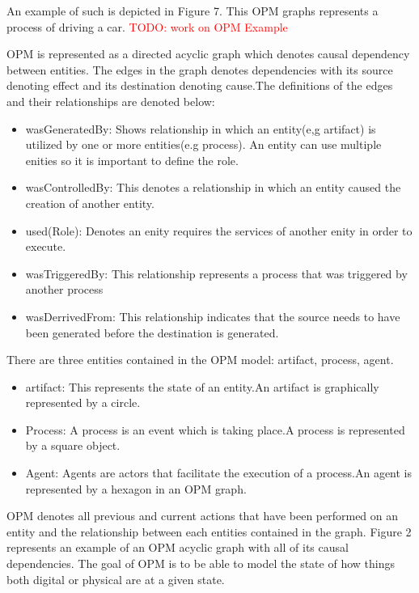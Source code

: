 An example of such is depicted in Figure 7. This OPM graphs represents a process of driving a car.  \textcolor{red}{TODO: work on OPM Example}



OPM is represented as a directed acyclic graph which denotes causal dependency between entities. The edges in the graph denotes dependencies with its source denoting effect and its destination denoting cause.The definitions of the edges and their relationships are denoted below: 


\begin{itemize}
\item wasGeneratedBy: Shows relationship in which an entity(e,g artifact) is utilized by one or  more entities(e.g process). An entity can use multiple enities so it is important to define the role.  
\item wasControlledBy: This denotes a relationship in which an entity caused the creation of another entity.
\item used(Role): Denotes an enity requires the services of another enity in order to execute.
\item wasTriggeredBy: This relationship represents a process that was triggered by another process
\item wasDerrivedFrom: This relationship indicates that the source needs to have been generated before the destination is generated.
\end{itemize}

 There are three entities contained in the OPM model: artifact, process, agent. 

\begin{itemize}
\item
artifact: This represents the state of an entity.An artifact is graphically represented by a circle.

\item
Process: A process is an event which is taking place.A process is represented by a square object.

\item 
Agent: Agents are actors that facilitate the execution of a process.An agent is represented by a hexagon in an OPM graph.
\end{itemize}

OPM denotes all previous and current actions that have been performed on an entity and  the relationship between each entities contained in the graph. Figure 2 represents an example of an OPM acyclic graph with all of its causal dependencies. The goal of OPM is to be able to model the state of how things both digital or physical are at a given state.   

